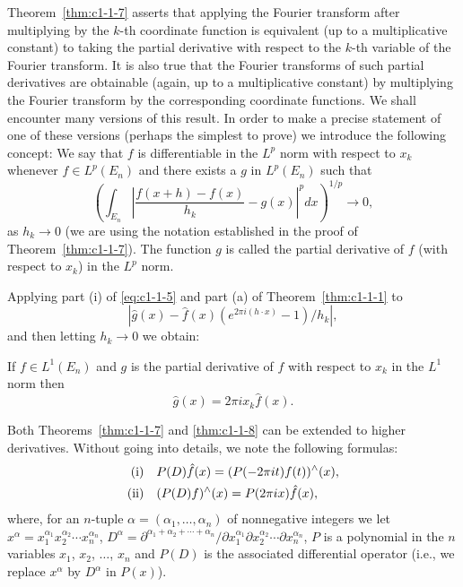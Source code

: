 Theorem~\ref{thm:c1-1-7} asserts that applying the Fourier transform after
multiplying by the $k$-th coordinate function is equivalent (up to a
multiplicative constant) to taking the partial derivative with respect to the
$k$-th variable of the Fourier transform. It is also true that the Fourier
transforms of such partial derivatives are obtainable (again, up to a
multiplicative constant) by multiplying the Fourier transform by the
corresponding coordinate functions. We shall encounter many versions of this
result. In order to make a precise statement of one of these versions (perhaps
the simplest to prove) we introduce the following concept: We say that $f$ is
differentiable in the $L^{p}$ norm with respect to $x_{k}$ whenever
$f \in L^{p}(E_{n})$ and there exists a $g$ in $L^{p}(E_{n})$ such that
\[
\left(\int_{E_{n}}\left|\frac{f(x+h)-f(x)}{h_{k}}-g(x)\right|^{p}dx\right)^{1/p}\to0,
\]
as $h_{k} \to 0$ (we are using the notation established in the proof of
Theorem~\ref{thm:c1-1-7}). The function $g$ is called the partial derivative of
$f$ (with respect to $x_{k}$) in the $L^{p}$ norm.

Applying part (i) of \eqref{eq:c1-1-5} and part (a) of
Theorem~\ref{thm:c1-1-1} to
\[
|\hat{g}(x)-\hat{f}(x)(e^{2\pi i(h\cdot x)}-1)/h_{k}|,
\]
and then letting $h_{k} \to 0$ we obtain:

\begin{theorem}\label{thm:c1-1-8}
If $f \in L^{1}(E_{n})$ and $g$ is the partial derivative of $f$ with respect to
$x_{k}$ in the $L^{1}$ norm then
\[
\hat{g}(x)=2\pi i x_{k}\hat{f}(x).
\]
\end{theorem}

Both Theorems~\ref{thm:c1-1-7} and \ref{thm:c1-1-8} can be extended to higher
derivatives. Without going into details, we note the following formulas:
\begin{equation}\label{eq:c1-1-9}
\begin{aligned}
\textup{(i)}\quad &P(D)\hat{f}(x)=(P(-2\pi i t)f(t))^{\wedge}(x),\\
\textup{(ii)}\quad &(P(D)f)^{\wedge}(x)=P(2\pi i x)\hat{f}(x),
\end{aligned}
\end{equation}
where, for an $n$-tuple $\alpha = (\alpha_{1}, \ldots, \alpha_{n})$ of
nonnegative integers we let
$x^{\alpha} = x_{1}^{\alpha_{1}} x_{2}^{\alpha_{2}} \cdots x_{n}^{\alpha_{n}}$,
$D^{\alpha} = \partial^{\alpha_{1} + \alpha_{2} + \cdots + \alpha_{n}} / \partial x_{1}^{\alpha_{1}} \partial x_{2}^{\alpha_{2}} \cdots \partial x_{n}^{\alpha_{n}}$,
$P$ is a polynomial in the $n$ variables $x_{1}$, $x_{2}$, $\ldots$, $x_{n}$
and $P(D)$ is the associated differential operator (i.e., we replace $x^{\alpha}$
by $D^{\alpha}$ in $P(x)$).

